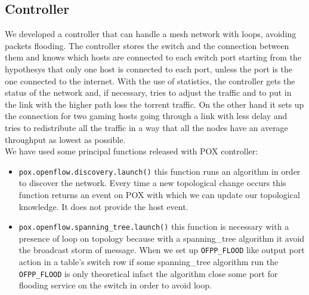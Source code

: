 \documentclass[article,10pt]{IEEEtran}
\begin{document}
\subsection{Controller}
We developed a controller that can handle a mesh network with loops, avoiding
packets flooding. The controller stores the switch and the connection between them and knows which hosts are connected to each switch port starting from the hypothesys that only one
host is connected to each port, unless the port is the one connected to the internet.
With the use of statistics, the controller gets the status of the network and, if necessary,
tries to adjust the traffic and to put in the link with the higher path loss the torrent traffic.
On the other hand it sets up the connection for two gaming hosts going through a link with less delay and tries to redistribute all the 
traffic in a way that all the nodes have an average throughput as lowest as possible.
\\
\newline
We have used some principal functions released with POX controller:
\begin{itemize}
 \item \texttt{pox.openflow.discovery.launch()} this function runs an algorithm in order to discover the network. Every time a new
 topological change occurs this function returns an event on POX with which we can update our topological knowledge.
 It does not provide the host event\cite{pox}.
 
 \item \texttt{pox.openflow.spanning_tree.launch()} this function is necessary with a presence of loop on topology
 because with a spanning_tree algorithm it avoid the broadcast storm of message. When we set up \texttt{OFPP_FLOOD} like output port action in a table's
 switch row if some spanning_tree algorithm run the \texttt{OFPP_FLOOD} is only theoretical infact the algorithm close some port for flooding service
 on the switch in order to avoid loop\cite{pox}.
\end{itemize}
\end{document}

